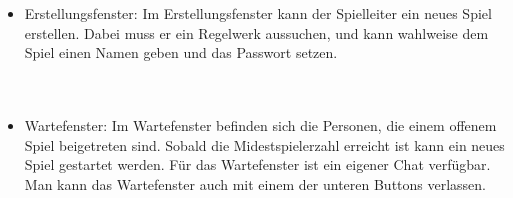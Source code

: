 \documentclass{article}
\begin{document}
\begin{itemize}
		\newpage
	\item \gls{Erstellungsfenster}: Im \gls{Erstellungsfenster} kann der \gls{Spielleiter} ein neues Spiel erstellen. Dabei muss er ein 			\gls{Regelwerk} aussuchen, und kann wahlweise dem Spiel einen Namen geben und das Passwort setzen. \\
		\ \\
		\ \\
	\item \gls{Wartefenster}: Im \gls{Wartefenster} befinden sich die Personen, die einem offenem Spiel beigetreten sind. Sobald 					die Midestspielerzahl erreicht ist kann ein neues Spiel gestartet werden. Für das Wartefenster ist ein eigener 					Chat verfügbar. Man kann das Wartefenster auch mit einem der unteren Buttons verlassen. \\
		\ \\

\end{itemize}
\end{document}
